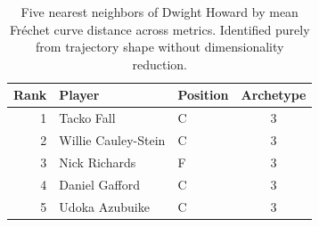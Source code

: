 \begin{table}[htbp]
  \centering\small
  \begin{tabular}{rllc}
    \toprule
    Rank & Player & Position & Archetype \\
    \midrule
    1 & Tacko Fall & C & 3 \\
    2 & Willie Cauley-Stein & C & 3 \\
    3 & Nick Richards & F & 3 \\
    4 & Daniel Gafford & C & 3 \\
    5 & Udoka Azubuike & C & 3 \\
    \bottomrule
  \end{tabular}
  \caption{Five nearest neighbors of Dwight Howard by mean Fr\'{e}chet curve distance across metrics. Identified purely from trajectory shape without dimensionality reduction.}
  \label{tab:Dwight_Howard_frechet_curve_neighbors}
\end{table}

